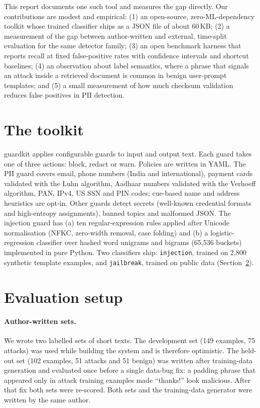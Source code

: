 \documentclass[11pt]{article}
\begin{document}
This report documents one such tool and measures the gap directly. Our contributions are modest and empirical: (1) an open-source, zero-ML-dependency toolkit whose trained classifier ships as a JSON file of about 60\,KB; (2) a measurement of the gap between author-written and external, time-split evaluation for the same detector family; (3) an open benchmark harness that reports recall at fixed false-positive rates with confidence intervals and shortcut baselines; (4) an observation about label semantics, where a phrase that signals an attack inside a retrieved document is common in benign user-prompt templates; and (5) a small measurement of how much checksum validation reduces false positives in PII detection.

\section{The toolkit}
guardkit applies configurable guards to input and output text. Each guard takes one of three actions: block, redact or warn. Policies are written in YAML. The PII guard covers email, phone numbers (India and international), payment cards validated with the Luhn algorithm, Aadhaar numbers validated with the Verhoeff algorithm, PAN, IPv4, US SSN and PIN codes; cue-based name and address heuristics are opt-in. Other guards detect secrets (well-known credential formats and high-entropy assignments), banned topics and malformed JSON. The injection guard has (a) ten regular-expression rules applied after Unicode normalisation (NFKC, zero-width removal, case folding) and (b) a logistic-regression classifier over hashed word unigrams and bigrams (65,536 buckets) implemented in pure Python. Two classifiers ship: \texttt{injection}, trained on 2,800 synthetic template examples, and \texttt{jailbreak}, trained on public data (Section~\ref{sec:setup}).

\section{Evaluation setup}\label{sec:setup}
\paragraph{Author-written sets.} We wrote two labelled sets of short texts. The development set (149 examples, 75 attacks) was used while building the system and is therefore optimistic. The held-out set (102 examples, 51 attacks and 51 benign) was written after training-data generation and evaluated once before a single data-bug fix: a padding phrase that appeared only in attack training examples made ``thanks!'' look malicious. After that fix both sets were re-scored. Both sets and the training-data generator were written by the same author.
\end{document}
